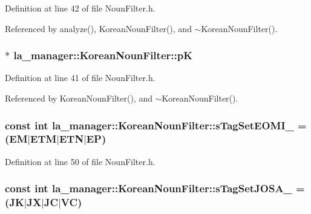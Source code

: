 Definition at line 42 of file NounFilter.h.

Referenced by analyze(), KoreanNounFilter(), and $\sim$KoreanNounFilter().\hypertarget{classla__manager_1_1KoreanNounFilter_9da3dab8d3dafb70aee2869e892c02fd}{
\subsubsection[{pK}]{$\ast$ {\bf la\_\-manager::KoreanNounFilter::pK}}}
\label{classla__manager_1_1KoreanNounFilter_9da3dab8d3dafb70aee2869e892c02fd}




Definition at line 41 of file NounFilter.h.

Referenced by KoreanNounFilter(), and $\sim$KoreanNounFilter().\hypertarget{classla__manager_1_1KoreanNounFilter_bc755f0dfcfcfa1000d573d9049aea2d}{
\subsubsection[{sTagSetEOMI\_\-}]{\setlength{\rightskip}{0pt plus 5cm}const int {\bf la\_\-manager::KoreanNounFilter::sTagSetEOMI\_\-} = (EM$|$ETM$|$ETN$|$EP)}}
\label{classla__manager_1_1KoreanNounFilter_bc755f0dfcfcfa1000d573d9049aea2d}




Definition at line 50 of file NounFilter.h.\hypertarget{classla__manager_1_1KoreanNounFilter_297deec22f0c84a6f16e612f531c4485}{
\subsubsection[{sTagSetJOSA\_\-}]{\setlength{\rightskip}{0pt plus 5cm}const int {\bf la\_\-manager::KoreanNounFilter::sTagSetJOSA\_\-} = (JK$|$JX$|$JC$|$VC)}}
\label{classla__manager_1_1KoreanNounFilter_297deec22f0c84a6f16e612f531c4485}




